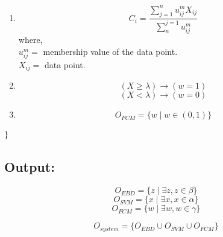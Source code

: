 \documentclass[12pt,a4paper,final]{report}
\DeclareRobustCommand{\gobblefive}[5]{}
\newcommand*{\SkipTocEntry}{\addtocontents{toc}{\gobblefive}}
\begin{document}
{{{{{\begin{enumerate}
\item
\begin{equation}
C_{i} = \frac{\sum_{j=1}^{n}u_{ij}^{m}X_{ij}}{\sum_{n}^{j=1}u_{ij}^{m}}
\end{equation}
where, \\ $u_{ij}^{m}=$ membership value of the data point. \\
$X_{ij}=$ data point. 


\item
\begin{equation}
(X \geq \lambda) \rightarrow (w = 1)
\end{equation}
\begin{equation}
(X < \lambda) \rightarrow (w = 0)
\end{equation}


\item
\begin{equation}
O_{FCM} = \lbrace w \mid w \in (0, 1) \rbrace
\end{equation}

\end{enumerate}

$\\ \rbrace$




\SkipTocEntry\subsection{Output:}

\begin{equation}
O_{EBD} = \lbrace z \mid \exists z, z \in \beta \rbrace
\end{equation}
\begin{equation}
O_{SVM} = \lbrace x \mid \exists x, x \in \alpha \rbrace
\end{equation}
\begin{equation}
O_{FCM} = \{w \mid \exists w, w\in \gamma \rbrace
\end{equation}


\begin{equation}
O_{system} = \lbrace O_{EBD} \cup O_{SVM} \cup O_{FCM} \rbrace
\end{equation}

}}}}}
\end{document}
